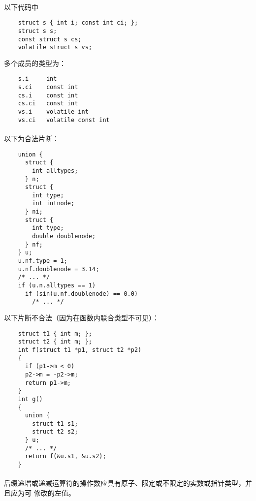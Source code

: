 \paragraph{}
\ex 以下代码中
\begin{lstlisting}
    struct s { int i; const int ci; };
    struct s s;
    const struct s cs;
    volatile struct s vs;
\end{lstlisting}
多个成员的类型为：
\begin{lstlisting}
    s.i     int
    s.ci    const int
    cs.i    const int
    cs.ci   const int
    vs.i    volatile int
    vs.ci   volatile const int
\end{lstlisting}

\paragraph{}
\ex 以下为合法片断：
\begin{lstlisting}
    union {
      struct {
        int alltypes;
      } n;
      struct {
        int type;
        int intnode;
      } ni;
      struct {
        int type;
        double doublenode;
      } nf;
    } u;
    u.nf.type = 1;
    u.nf.doublenode = 3.14;
    /* ... */
    if (u.n.alltypes == 1)
      if (sin(u.nf.doublenode) == 0.0)
        /* ... */
\end{lstlisting}
以下片断不合法（因为在函数内联合类型不可见）：
\begin{lstlisting}
    struct t1 { int m; };
    struct t2 { int m; };
    int f(struct t1 *p1, struct t2 *p2)
    {
      if (p1->m < 0)
      p2->m = -p2->m;
      return p1->m;
    }
    int g()
    {
      union {
        struct t1 s1;
        struct t2 s2;
      } u;
      /* ... */
      return f(&u.s1, &u.s2);
    }
\end{lstlisting}


\constraint
\paragraph{}
后缀递增或递减运算符的操作数应具有原子、限定或不限定的实数或指针类型，并且应为可
修改的左值。

\semantic
